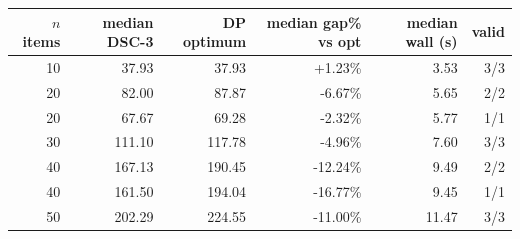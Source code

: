 \begin{tabular}{rrrrrr}
\toprule
$n$ items & median DSC-3 & DP optimum & median gap\% vs opt & median wall (s) & valid \\
\midrule
10 & 37.93 & 37.93 & +1.23\% & 3.53 & 3/3 \\
20 & 82.00 & 87.87 & -6.67\% & 5.65 & 2/2 \\
20 & 67.67 & 69.28 & -2.32\% & 5.77 & 1/1 \\
30 & 111.10 & 117.78 & -4.96\% & 7.60 & 3/3 \\
40 & 167.13 & 190.45 & -12.24\% & 9.49 & 2/2 \\
40 & 161.50 & 194.04 & -16.77\% & 9.45 & 1/1 \\
50 & 202.29 & 224.55 & -11.00\% & 11.47 & 3/3 \\
\bottomrule
\end{tabular}
